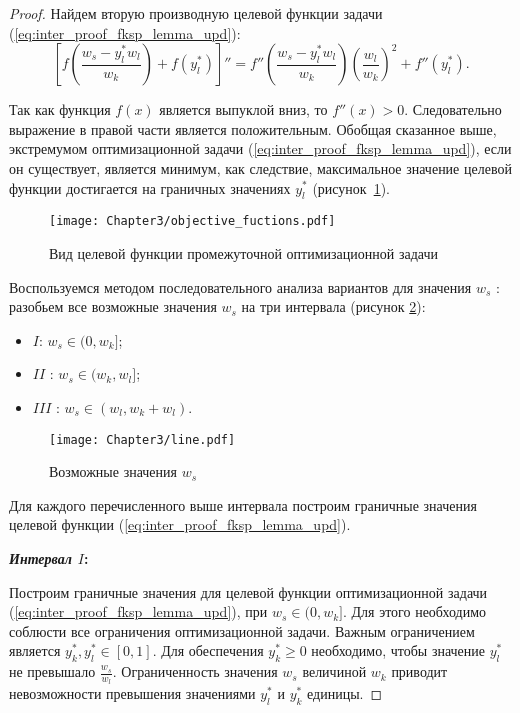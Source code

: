 \begin{proof}
Найдем вторую производную целевой функции задачи (\ref{eq:inter_proof_fksp_lemma_upd}):
$$\left[f\left(\frac{w_s - y_l^{*} w_l}{w_k}\right) + f(y_l^{*})\right]'' = f''\left(\frac{w_s - y_l^{*} w_l}{w_k}\right) \left(\frac{w_l}{w_k}\right)^2 + f''(y_l^{*}).$$

Так как функция $f(x)$ является выпуклой вниз, то $f''(x) > 0$. Следовательно выражение в правой части является положительным. Обобщая сказанное выше, экстремумом оптимизационной задачи (\ref{eq:inter_proof_fksp_lemma_upd}), если он существует, является минимум, как следствие, максимальное значение целевой функции достигается на граничных значениях $y_l^{*}$ (рисунок~\ref{fig:ObjectiveFunctions}).

\begin{figure}[htbp]
\begin{center}
\texttt{[image: Chapter3/objective\_fuctions.pdf]}
\caption{Вид целевой функции промежуточной оптимизационной задачи}
\label{fig:ObjectiveFunctions}
\end{center}
\end{figure}

Воспользуемся методом последовательного анализа вариантов для значения $w_s$ \cite{optimizations_methods}: разобьем все возможные значения $w_s$ на три интервала (рисунок \ref{fig:line}):
\begin{itemize}
	\item $I$: $w_s \in (0, w_k]$;
	\item $II$ : $w_s \in (w_k, w_l]$;
	\item $III$ : $w_s \in (w_l, w_k+w_l)$.
\end{itemize}

\begin{figure}[h!]
\begin{center}
\texttt{[image: Chapter3/line.pdf]}
\caption{Возможные значения $w_s$}
\label{fig:line}
\end{center}
\end{figure}

Для каждого перечисленного выше интервала построим граничные значения целевой функции (\ref{eq:inter_proof_fksp_lemma_upd}).

\textbf{\textit{Интервал $I$}:}

Построим граничные значения для целевой функции оптимизационной задачи (\ref{eq:inter_proof_fksp_lemma_upd}), при $w_s \in (0, w_k]$. Для этого необходимо соблюсти все ограничения оптимизационной задачи. Важным ограничением является $y_k^{*},y_l^{*} \in [0,1]$. Для обеспечения $y_k^{*} \geq 0$ необходимо, чтобы значение $y_l^{*}$ не превышало $\frac{w_s}{w_l}$. Ограниченность значения $w_s$ величиной $w_k$ приводит невозможности превышения значениями $y_l^{*}$ и $y_k^{*}$ единицы.


\end{proof}
